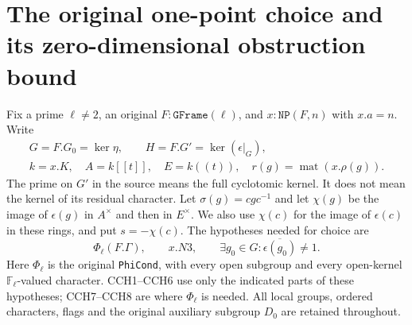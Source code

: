 \section{The original one-point choice and its zero-dimensional obstruction bound}
\label{sec:count-choice-v036}


Fix a prime $\ell\ne2$, an original $F:\texttt{GFrame}(\ell)$, and
$x:\texttt{NP}(F,n)$ with $x.a=n$.  Write
\[
 \begin{gathered}
 G=F.G_0=\ker\eta,\qquad H=F.G'=\ker(\epsilon|_G),\\
 k=x.K,\quad A=k[[t]],\quad E=k((t)),\quad
 r(g)=\operatorname{mat}(x.\rho(g)).
 \end{gathered}
 \tag{CCH.1}
\]
The prime on $G'$ in the source means the full cyclotomic kernel.
It does not mean the kernel of its residual character.  Let
$\sigma(g)=cgc^{-1}$ and let $\chi(g)$ be the image of
$\epsilon(g)$ in $A^\times$ and then in $E^\times$.
We also use $\chi(c)$ for the image of $\epsilon(c)$ in these rings,
and put $s=-\chi(c)$.  The hypotheses needed for choice are
\[
 \Phi_\ell(F.\Gamma),\qquad x.N3,\qquad
 \exists g_0\in G:\overline{\epsilon(g_0)}\ne1.
 \tag{CCH.2}
\]
Here $\Phi_\ell$ is the original \texttt{PhiCond}, with every open
subgroup and every open-kernel $\mathbb F_\ell$-valued character.
CCH1--CCH6 use only the indicated parts of these hypotheses;
CCH7--CCH8 are where $\Phi_\ell$ is needed.
All local groups, ordered characters, flags and the original
auxiliary subgroup $D_0$ are retained throughout.

